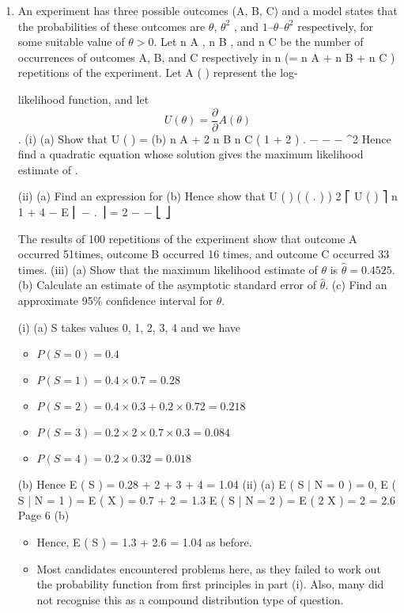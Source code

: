 \documentclass[a4paper,12pt]{article}
\begin{document}
\begin{enumerate}
\item An experiment has three possible outcomes (A, B, C) and a model states that the
probabilities of these outcomes are $\theta$, $\theta^2$ , and $1 – \theta – \theta^2$ respectively, for some suitable
value of $\theta > 0$.
Let n A , n B , and n C be the number of occurrences of outcomes A, B, and C respectively
in n (= n A + n B + n C ) repetitions of the experiment. Let A ( \theta ) represent the log-
 
likelihood function, and let \[U ( \theta ) =
\frac{\partial}{\partial} A ( \theta )\]
.
\frac{\partial}{\partial}\theta\]
(i)
(a)
Show that
U ( \theta ) =
(b)
n A + 2 n B n C ( 1 + 2 \theta )
.
−
 − \theta − \theta^2
Hence find a quadratic equation whose solution gives the maximum
likelihood estimate of \theta.

(ii)
(a) Find an expression for
(b) Hence show that
\frac{\partial}{\partial} U ( \theta )
\frac{\partial}{\partial}\theta
(
(
.
)
)
2
⎡ \frac{\partial}{\partial} U ( \theta ) ⎤ n 1 + 4 \theta − \theta
E ⎢ −
.
⎥ =
2
\frac{\partial}{\partial}\theta
\theta
−
\theta
−
⎣
⎦

The results of 100 repetitions of the experiment show that outcome A occurred
51times, outcome B occurred 16 times, and outcome C occurred 33 times.
(iii)
(a) Show that the maximum likelihood estimate of $\theta$ is $\hat{\theta}= 0.4525$.
(b) Calculate an estimate of the asymptotic standard error of $\hat{\theta}$.
(c) Find an approximate 95\% confidence interval for $\theta$.



(i)
(a)
S takes values 0, 1, 2, 3, 4 and we have
\begin{itemize}
\item $ P ( S = 0 ) = 0.4 $
\item $ P ( S = 1 ) = 0.4 \times 0.7 = 0.28 $
\item $ P ( S = 2 ) = 0.4 \times 0.3 + 0.2 \times 0.7 2 = 0.218$
\item $ P ( S = 3 ) = 0.2 \times 2 \times 0.7 \times 0.3 = 0.084$
\item $ P ( S = 4 ) = 0.2 \times 0.3 2 = 0.018$
\end{itemize}
(b)
Hence
E ( S ) = 0.28 + 2  + 3  + 4  = 1.04
(ii)
(a)
E ( S | N = 0 ) = 0,
E ( S | N = 1 ) = E ( X ) = 0.7 + 2  = 1.3
E ( S | N = 2 ) = E ( 2 X ) = 2  = 2.6
Page 6%
(b)
\begin{itemize}
\item Hence, E ( S ) = 1.3  + 2.6  = 1.04 as before.
\item Most candidates encountered problems here, as they failed to work out the probability
function from first principles in part (i). Also, many did not recognise this as a
compound distribution type of question.
\end{itemize}


\end{enumerate}
\end{document}
